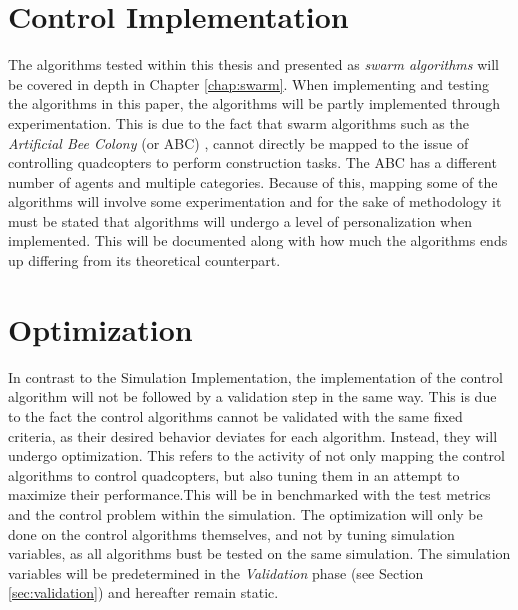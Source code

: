 \section{Control Implementation}
The algorithms tested within this thesis and presented as \textit{swarm algorithms} will be covered in depth in Chapter \ref{chap:swarm}. When implementing and testing the algorithms in this paper, the algorithms will be partly implemented through experimentation. This is due to the fact that swarm algorithms such as the \textit{Artificial Bee Colony} (or ABC) \cite{bhattacharjee_multi-robot_2011}, cannot directly be mapped to the issue of controlling quadcopters to perform construction tasks. The ABC has a different number of agents and multiple categories. Because of this, mapping some of the algorithms will involve some experimentation and for the sake of methodology it must be stated that algorithms will undergo a level of personalization when implemented. This will be documented along with how much the algorithms ends up differing from its theoretical counterpart. 

\section{Optimization}
In contrast to the Simulation Implementation, the implementation of the control algorithm will not be followed by a validation step in the same way. This is due to the fact the control algorithms cannot be validated with the same fixed criteria, as their desired behavior deviates for each algorithm. Instead, they will undergo optimization. This refers to the activity of not only mapping the control algorithms to control quadcopters, but also tuning them in an attempt to maximize their performance.This will be in benchmarked with the test metrics and the control problem within the simulation. The optimization will only be done on the control algorithms themselves, and not by tuning simulation variables, as all algorithms bust be tested on the same simulation. The simulation variables will be predetermined in the \textit{Validation} phase (see Section \ref{sec:validation}) and hereafter remain static. 



